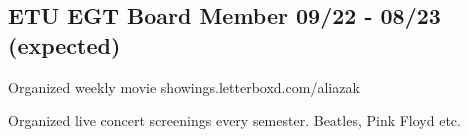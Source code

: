 \documentclass[a4paper,12pt]{article}
\begin{document}
\vspace*{10pt}
\subsection{{ETU EGT Board Member }\hfill 09/22 - 08/23 (expected)}
\begin{zitemize}
\item Organized weekly movie showings.\hfill letterboxd.com/aliazak
\item Organized live concert screenings every semester. Beatles, Pink Floyd etc.

\end{zitemize}
\end{document}
